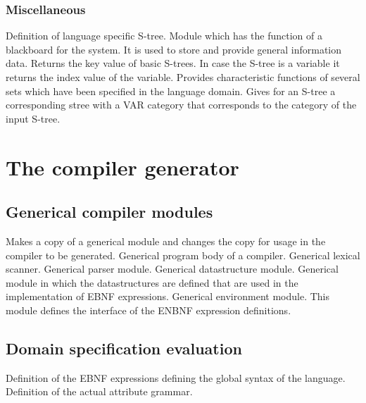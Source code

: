 \subsubsection{Miscellaneous}

\bsc
{} Definition of language specific S-tree.
 Module which has the function of a blackboard for the
                       system. It is used to store and provide general
                       information data.
 Returns the key value of basic S-trees. In case the S-tree is
                  a variable it returns the index value of the variable.
 Provides characteristic functions of several sets which
                   have been specified in the language domain.
 Gives for an S-tree a corresponding stree with a VAR
                    category that corresponds to the category of the input
                    S-tree.
\esc


\newpage
\section{The compiler generator}
\subsection{Generical compiler modules}
\bsc
{} Makes a copy of a generical module and changes the copy
                      for usage in the compiler to be generated.
 Generical program body of a compiler.
 Generical lexical scanner.
 Generical parser module.
 Generical datastructure module.
 Generical module  in which the datastructures are
                          defined that are used in the implementation of
                          EBNF expressions.
 Generical environment module. This module
                          defines the interface of the ENBNF expression
                          definitions.
\esc
\subsection{Domain specification evaluation}
\bsc
{}
 Definition of the EBNF expressions defining
                          the global syntax of the language.
 Definition of the actual attribute grammar.
\esc
